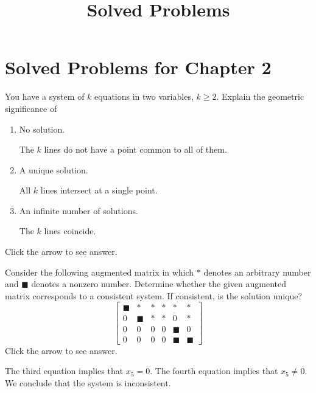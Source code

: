 \documentclass{ximera}
\title{Solved Problems} \license{CC BY-NC-SA 4.0}
\begin{document}
\begin{abstract}
\end{abstract}
\maketitle

\section*{Solved Problems for Chapter 2} 


\begin{problem}\label{prb:2.3} You have a system of $k$ equations in two variables, $k\geq 2$.
Explain the geometric significance of

\begin{enumerate}
\item No solution.

\begin{expandable}{}{}
    The $k$ lines do not have a point common to all of them.
\end{expandable}
\item A unique solution.

\begin{expandable}{}{}
    All $k$ lines intersect at a single point.
\end{expandable}
\item An infinite number of solutions.

\begin{expandable}{}{}
    The $k$ lines coincide.
\end{expandable}
\end{enumerate}
Click the arrow to see answer.

\end{problem}

\begin{problem}\label{prb:2.7}
Consider the following augmented matrix in which $\ast $ denotes an arbitrary
number and $\blacksquare $ denotes a nonzero number. Determine whether the
given augmented matrix corresponds to a consistent system. If consistent, is the solution unique?
\begin{equation*}
\left[
\begin{array}{ccccc|c}
\blacksquare & \ast & \ast & \ast & \ast & \ast \\
0 & \blacksquare & \ast & \ast & 0 & \ast \\
0 & 0 & 0 & 0 & \blacksquare & 0 \\
0 & 0 & 0 & 0 & \blacksquare & \blacksquare
\end{array}
\right]
\end{equation*}
Click the arrow to see answer. 
\begin{expandable}{}{}
The third equation implies that $x_5 = 0$.  The fourth equation implies that $x_5 \ne 0$.  We conclude that the system is inconsistent.
\end{expandable}
\end{problem}
\end{document}
